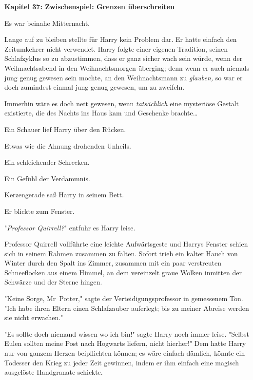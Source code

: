

\hypertarget{zwischenspiel-grenzen-uxfcberschreiten}{%

\textbf{Kapitel 37: Zwischenspiel: Grenzen überschreiten}

Es war beinahe Mitternacht.

Lange auf zu bleiben stellte für Harry kein Problem dar. Er hatte einfach den Zeitumkehrer nicht verwendet. Harry folgte einer eigenen Tradition, seinen Schlafzyklus so zu abzustimmen, dass er ganz sicher wach sein würde, wenn der Weihnachtsabend in den Weihnachtsmorgen überging; denn wenn er auch niemals jung genug gewesen sein mochte, an den Weihnachtsmann zu \emph{glauben,} so war er doch zumindest einmal jung genug gewesen, um zu zweifeln.

Immerhin wäre es doch nett gewesen, wenn \emph{tatsächlich} eine mysteriöse Gestalt existierte, die des Nachts ins Haus kam und Geschenke brachte…

Ein Schauer lief Harry über den Rücken.

Etwas wie die Ahnung drohenden Unheils.

Ein schleichender Schrecken.

Ein Gefühl der Verdammnis.

Kerzengerade saß Harry in seinem Bett.

Er blickte zum Fenster.

"\emph{Professor Quirrell?}" entfuhr es Harry leise.

Professor Quirrell vollführte eine leichte Aufwärtsgeste und Harrys Fenster schien sich in seinem Rahmen zusammen zu falten. Sofort trieb ein kalter Hauch von Winter durch den Spalt ins Zimmer, zusammen mit ein paar verstreuten Schneeflocken aus einem Himmel, an dem vereinzelt graue Wolken inmitten der Schwärze und der Sterne hingen.

"Keine Sorge, Mr~Potter," sagte der Verteidigungsprofessor in gemessenem Ton. "Ich habe ihren Eltern einen Schlafzauber auferlegt; bis zu meiner Abreise werden sie nicht erwachen."

"Es sollte doch niemand wissen wo ich bin!" sagte Harry noch immer leise. "Selbst Eulen sollten meine Post nach Hogwarts liefern, nicht hierher!" Dem hatte Harry nur von ganzem Herzen beipflichten können; es wäre einfach dämlich, könnte ein Todesser den Krieg zu jeder Zeit gewinnen, indem er ihm einfach eine magisch ausgelöste Handgranate schickte.

}
